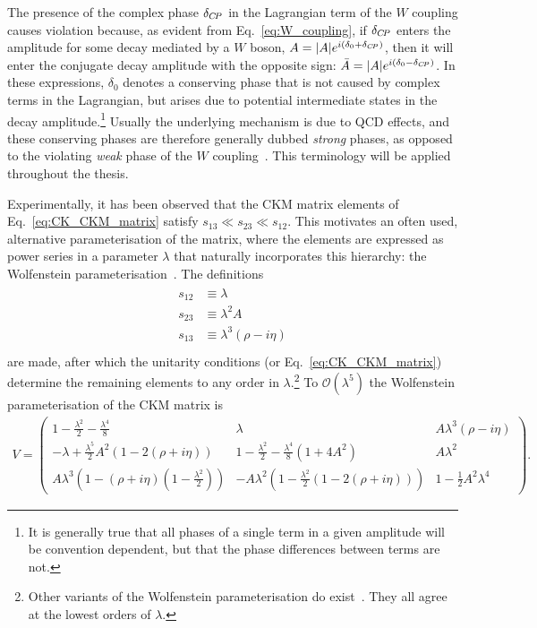 The presence of the complex phase $\delta_{{C\!P}}$ in the Lagrangian term of the $W$ coupling causes \CP violation because, as evident from Eq.~\eqref{eq:W_coupling}, if $\delta_{{C\!P}}$ enters the amplitude for some decay mediated by a $W$ boson, $A=|A|e^{i(\delta_0 + \delta_{{C\!P}})}$, then it will enter the \CP conjugate decay amplitude with the opposite sign: $\bar A=|A|e^{i(\delta_0 - \delta_{{C\!P}})}$. In these expressions, $\delta_0$ denotes a \CP conserving phase that is not caused by complex terms in the Lagrangian, but arises due to potential intermediate states in the decay amplitude.\footnote{It is generally true that all phases of a single term in a given amplitude will be convention dependent, but that the phase differences between terms are not.} Usually the underlying mechanism is due to QCD effects, and these \CP conserving phases are therefore generally dubbed \emph{strong} phases, as opposed to the \CP violating \emph{weak} phase of the $W$ coupling~\cite{PDG2019}. This terminology will be applied throughout the thesis. 

Experimentally, it has been observed that the CKM matrix elements of Eq.~\eqref{eq:CK_CKM_matrix} satisfy $s_{13}\ll s_{23} \ll s_{12}$. This motivates an often used, alternative parameterisation of the matrix, where the elements are expressed as power series in a parameter  $\lambda$ that naturally incorporates this hierarchy: the Wolfenstein parameterisation~\cite{wolfensteinParametrizationKobayashiMaskawaMatrix1983}. The definitions
\begin{align}
    \begin{split}
         s_{12} &\equiv \lambda \\
         s_{23} &\equiv \lambda^2A \\
         s_{13} &\equiv \lambda^3(\rho - i \eta) \\
    \end{split}
\end{align}
are made, after which the unitarity conditions (or Eq.~\ref{eq:CK_CKM_matrix}) determine the remaining elements to any order in $\lambda$.\footnote{Other variants of the Wolfenstein parameterisation do exist~\cite{ahnWolfensteinParametrizationHigher2011}. They all agree at the lowest orders of $\lambda$.} 
To $\mathcal O (\lambda^5)$ the Wolfenstein parameterisation of the CKM matrix is~\cite{burasWaitingTopQuark1994,charlesCPViolationCKM2005}
% 
\begin{align}
    V = \begin{pmatrix}
        1-\frac{\lambda^2}{2} -\frac{\lambda^4}{8}&
        \lambda &
        A\lambda^3(\rho - i \eta) \\
        -\lambda+\frac{\lambda^5}{2}A^2(1-2(\rho+i\eta)) &
        1 - \frac{\lambda^2}{2} - \frac{\lambda^4}{8}(1+4A^2) &
        A\lambda^2 \\
        A \lambda^3(1-(\rho + i\eta)(1 - \frac{\lambda^2}{2})) &
        -A\lambda^2 (1- \frac{\lambda^2}{2}(1-2(\rho+i\eta)))&
        1 - \frac{1}{2}A^2\lambda^4
    \end{pmatrix}.
\end{align}{}

